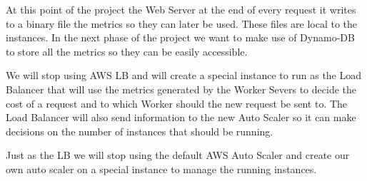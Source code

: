 \documentclass[times, 10pt,twocolumn]{article}
\begin{document}

   At this point of the project the Web Server at the end of every request 
   it writes to a binary file the metrics so they can later be used. These files
   are local to the instances. In the next phase of the project we want to make use
   of Dynamo-DB to store all the metrics so they can be easily accessible.

   We will stop using AWS LB and will create a special instance to run as the 
   Load Balancer that will use the metrics generated by the Worker Severs to
   decide the cost of a request and to which Worker should the new request be
   sent to. The Load Balancer will also send information to the new Auto Scaler
   so it can make decisions on the number of instances that should be running.

   Just as the LB we will stop using the default AWS Auto Scaler and create our 
   own auto scaler on a special instance to manage the running instances.

\nocite{ex1,ex2}


\end{document}
